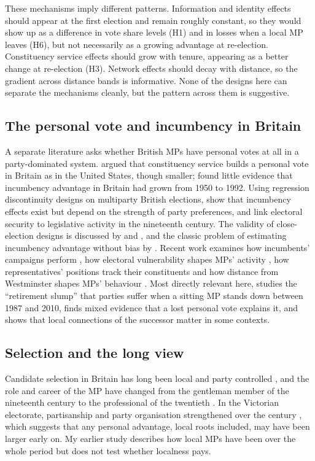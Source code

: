 \documentclass[11pt,a4paper]{article}
\begin{document}
These mechanisms imply different patterns. Information and identity effects should appear at the first election and remain roughly constant, so they would show up as a difference in vote share levels (H1) and in losses when a local MP leaves (H6), but not necessarily as a growing advantage at re-election. Constituency service effects should grow with tenure, appearing as a better change at re-election (H3). Network effects should decay with distance, so the gradient across distance bands is informative. None of the designs here can separate the mechanisms cleanly, but the pattern across them is suggestive.

\subsection{The personal vote and incumbency in Britain}
A separate literature asks whether British MPs have personal votes at all in a party-dominated system. \citet{cain1984,cain1987} argued that constituency service builds a personal vote in Britain as in the United States, though smaller; \citet{gaines1998} found little evidence that incumbency advantage in Britain had grown from 1950 to 1992. Using regression discontinuity designs on multiparty British elections, \citet{eggersspirling2017} show that incumbency effects exist but depend on the strength of party preferences, and \citet{eggersspirling2014} link electoral security to legislative activity in the nineteenth century. The validity of close-election designs is discussed by \citet{lee2008} and \citet{eggers2015}, and the classic problem of estimating incumbency advantage without bias by \citet{gelmanking1990}. Recent work examines how incumbents' campaigns perform \citep{pattie2017}, how electoral vulnerability shapes MPs' activity \citep{kellermann2016}, how representatives' positions track their constituents \citep{hanretty2017} and how distance from Westminster shapes MPs' behaviour \citep{willumsen2019}. Most directly relevant here, \citet{middleton2019} studies the ``retirement slump'' that parties suffer when a sitting MP stands down between 1987 and 2010, finds mixed evidence that a lost personal vote explains it, and shows that local connections of the successor matter in some contexts.

\subsection{Selection and the long view}
Candidate selection in Britain has long been local and party controlled \citep{norrislovenduski1995}, and the role and career of the MP have changed from the gentleman member of the nineteenth century to the professional of the twentieth \citep{rush2001}. In the Victorian electorate, partisanship and party organisation strengthened over the century \citep{cox1987}, which suggests that any personal advantage, local roots included, may have been larger early on. My earlier study \citep{hotham2026mpl} describes how local MPs have been over the whole period but does not test whether localness pays.
\end{document}

